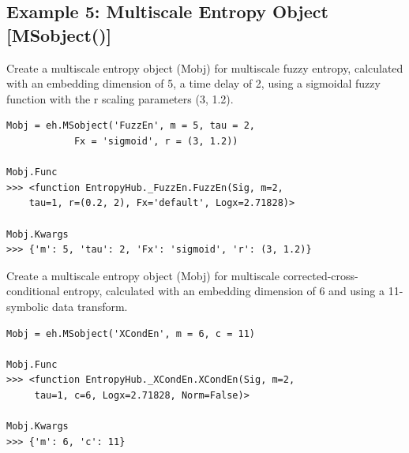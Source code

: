\documentclass[12pt, a4paper, titlepage, openany]{book}
\begin{document}
\newpage
\subsection{\normalsize Example 5: \hspace{15mm} Multiscale Entropy Object [MSobject()]} \label{ExMobjP}
\noindent Create a multiscale entropy object (Mobj) for multiscale fuzzy entropy, calculated with an embedding dimension of 5, a time delay of 2, using a sigmoidal fuzzy function with the r scaling parameters (3, 1.2).
\begin{verbatim}
Mobj = eh.MSobject('FuzzEn', m = 5, tau = 2, 
			Fx = 'sigmoid', r = (3, 1.2))

Mobj.Func
>>> <function EntropyHub._FuzzEn.FuzzEn(Sig, m=2, 
	tau=1, r=(0.2, 2), Fx='default', Logx=2.71828)>
	
Mobj.Kwargs
>>> {'m': 5, 'tau': 2, 'Fx': 'sigmoid', 'r': (3, 1.2)}
\end{verbatim}
Create a multiscale entropy object (Mobj) for multiscale corrected-cross-conditional entropy, calculated with an embedding dimension of 6 and using a 11-symbolic data transform.
\begin{verbatim}
Mobj = eh.MSobject('XCondEn', m = 6, c = 11)

Mobj.Func
>>> <function EntropyHub._XCondEn.XCondEn(Sig, m=2,
	 tau=1, c=6, Logx=2.71828, Norm=False)>

Mobj.Kwargs
>>> {'m': 6, 'c': 11}
\end{verbatim}


\newpage
\end{document}
